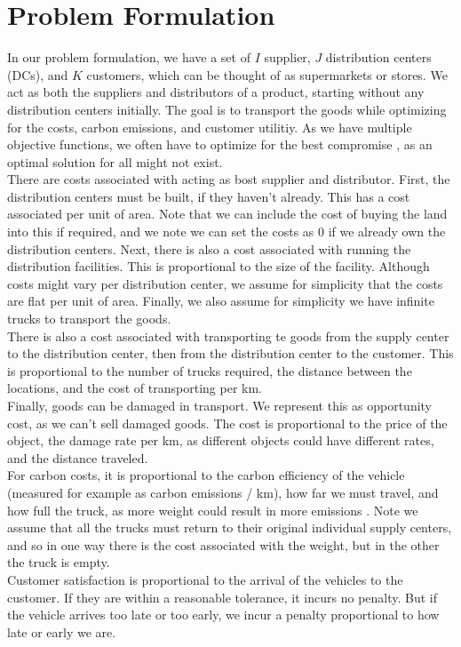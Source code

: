\documentclass[conference]{IEEEtran}
\begin{document}
\bigskip

\section{Problem Formulation}

In our problem formulation, we have a set of $I$ supplier, $J$ distribution centers (DCs), and $K$ customers, which can be thought of as supermarkets or stores.
We act as both the suppliers and distributors of a product, starting without any distribution centers initially. The goal is to transport the goods while optimizing for the costs, carbon emissions, and customer utilitiy. As we have multiple objective functions, we often have to optimize for the best compromise  \cite{benayounLinearProgrammingMultiple1971}, as an optimal solution for all might not exist. \\
There are costs associated with acting as bost supplier and distributor. First, the distribution 
centers must be built, if they haven't already. This has a cost associated per unit of area. Note that we can include the cost of buying the land into this if required, and we note we can set the costs as 0 if we already own the distribution centers.
Next, there is also a cost associated with running the distribution facilities. This is proportional to the size of the facility. Although costs might vary per distribution center, we assume for simplicity that the costs are flat per unit of area. Finally, we also assume for simplicity we have infinite trucks to transport the goods. \\
There is also a cost associated with transporting te goods from the supply center to the distribution center, then from the distribution center to the customer. This is proportional to the number of trucks required, the distance between the locations, and the cost of transporting per km.\\
Finally, goods can be damaged in transport. We represent this as opportunity cost, as we can't sell damaged goods. The cost is proportional to the price of the object, the damage rate per km, as different objects could have different rates, and the distance traveled.\\
For carbon costs, it is proportional to the carbon efficiency of the vehicle (measured for example as carbon emissions / km), how far we must travel, and how full the truck, as more weight could result in more emissions \cite{du_plessis_calculating_2023}. Note we assume that all the trucks must return to their original individual supply centers, and so in one way there is the cost associated with the weight, but in the other the truck is empty.\\
Customer satisfaction is proportional to the arrival of the vehicles to the customer. If they are within a reasonable tolerance, it incurs no penalty. But if the vehicle arrives too late or too early, we incur a penalty proportional to how late or early we are.
\end{document}
